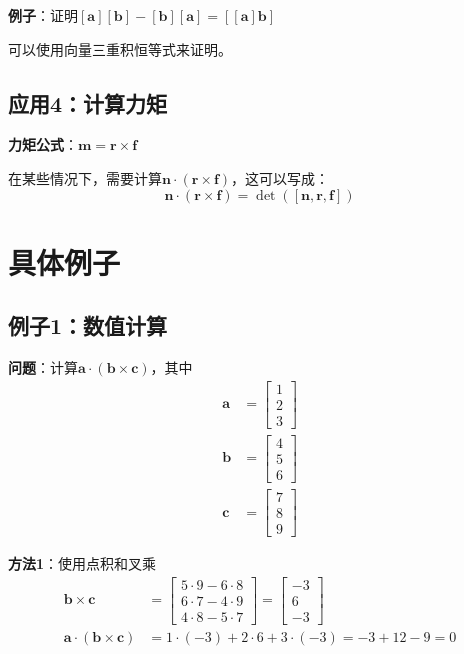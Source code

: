 \documentclass[12pt,a4paper]{article}
\begin{document}
\textbf{例子}：证明$[\bm{a}][\bm{b}] - [\bm{b}][\bm{a}] = [[\bm{a}]\bm{b}]$

可以使用向量三重积恒等式来证明。

\subsection{应用4：计算力矩}

\textbf{力矩公式}：$\bm{m} = \bm{r} \times \bm{f}$

在某些情况下，需要计算$\bm{n} \cdot (\bm{r} \times \bm{f})$，这可以写成：
\begin{equation}
\bm{n} \cdot (\bm{r} \times \bm{f}) = \det([\bm{n}, \bm{r}, \bm{f}])
\end{equation}

\section{具体例子}

\subsection{例子1：数值计算}

\textbf{问题}：计算$\bm{a} \cdot (\bm{b} \times \bm{c})$，其中
\begin{align}
\bm{a} &= \begin{bmatrix} 1 \\ 2 \\ 3 \end{bmatrix} \\
\bm{b} &= \begin{bmatrix} 4 \\ 5 \\ 6 \end{bmatrix} \\
\bm{c} &= \begin{bmatrix} 7 \\ 8 \\ 9 \end{bmatrix}
\end{align}

\textbf{方法1}：使用点积和叉乘
\begin{align}
\bm{b} \times \bm{c} &= \begin{bmatrix} 5 \cdot 9 - 6 \cdot 8 \\ 6 \cdot 7 - 4 \cdot 9 \\ 4 \cdot 8 - 5 \cdot 7 \end{bmatrix} = \begin{bmatrix} -3 \\ 6 \\ -3 \end{bmatrix} \\
\bm{a} \cdot (\bm{b} \times \bm{c}) &= 1 \cdot (-3) + 2 \cdot 6 + 3 \cdot (-3) = -3 + 12 - 9 = 0
\end{align}
\end{document}
